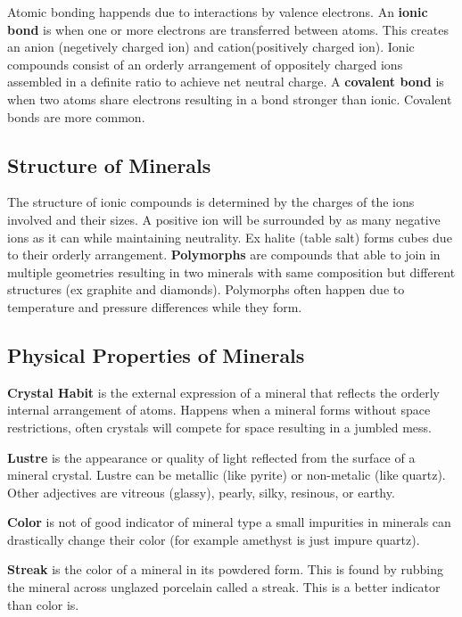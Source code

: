 \documentclass{article}
\begin{document}
Atomic bonding happends due to interactions by valence electrons. An \textbf{ionic bond} is when one or more electrons are transferred between atoms. This creates an anion (negetively charged ion) and cation(positively charged ion). Ionic compounds consist of an orderly arrangement of oppositely charged ions assembled in a definite ratio to achieve net neutral charge. A \textbf{covalent bond} is when two atoms share electrons resulting in a bond stronger than ionic. Covalent bonds are more common.

\subsection{Structure of Minerals} %
\label{sub:structure_of_minerals}
The structure of ionic compounds is determined by the charges of the ions involved and their sizes. A positive ion will be surrounded by as many negative ions as it can while maintaining neutrality. Ex halite (table salt) forms cubes due to their orderly arrangement. \textbf{Polymorphs} are compounds that able to join in multiple geometries resulting in two minerals with same composition but different structures (ex graphite and diamonds). Polymorphs often happen due to temperature and pressure differences while they form.

\subsection{Physical Properties of Minerals} %
\label{sub:physical_properties_of_minerals}
\textbf{Crystal Habit} is the external expression of a mineral that reflects the orderly internal arrangement of atoms. Happens when a mineral forms without space restrictions, often crystals will compete for space resulting in a jumbled mess.

\textbf{Lustre} is the appearance or quality of light reflected from the surface of a mineral crystal. Lustre can be metallic  (like pyrite) or non-metalic (like quartz). Other adjectives are vitreous (glassy), pearly, silky, resinous, or earthy.

\textbf{Color} is not of good indicator of mineral type a small impurities in minerals can drastically change their color (for example amethyst is just impure quartz).

\textbf{Streak} is the color of a mineral in its powdered form. This is found by rubbing the mineral across unglazed porcelain called a streak. This is a better indicator than color is.
\end{document}

